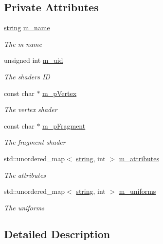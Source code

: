 \subsection*{Private Attributes}
\begin{DoxyCompactItemize}
\item 
\hyperlink{_types_8h_ad453f9f71ce1f9153fb748d6bb25e454}{string} \hyperlink{class_shader_a2bf551a2cc43f8057b308a59feb6aff5}{m\+\_\+name}
\begin{DoxyCompactList}\small\item\em The m name \end{DoxyCompactList}\item 
unsigned int \hyperlink{class_shader_a03d48d89f5a68e54fb26670ec870a240}{m\+\_\+uid}
\begin{DoxyCompactList}\small\item\em The shaders ID \end{DoxyCompactList}\item 
const char $\ast$ \hyperlink{class_shader_a58cc309451a90bf5cccc5216d5e1ceb6}{m\+\_\+p\+Vertex}
\begin{DoxyCompactList}\small\item\em The vertex shader \end{DoxyCompactList}\item 
const char $\ast$ \hyperlink{class_shader_a77269206699768f0e80250cd304526c1}{m\+\_\+p\+Fragment}
\begin{DoxyCompactList}\small\item\em The fragment shader \end{DoxyCompactList}\item 
std\+::unordered\+\_\+map$<$ \hyperlink{_types_8h_ad453f9f71ce1f9153fb748d6bb25e454}{string}, int $>$ \hyperlink{class_shader_afd151db19a90c4bf76fc07e4c291630e}{m\+\_\+attributes}
\begin{DoxyCompactList}\small\item\em The attributes \end{DoxyCompactList}\item 
std\+::unordered\+\_\+map$<$ \hyperlink{_types_8h_ad453f9f71ce1f9153fb748d6bb25e454}{string}, int $>$ \hyperlink{class_shader_a103462c159aa15d542e986031df0b892}{m\+\_\+uniforms}
\begin{DoxyCompactList}\small\item\em The uniforms \end{DoxyCompactList}\end{DoxyCompactItemize}


\subsection{Detailed Description}


